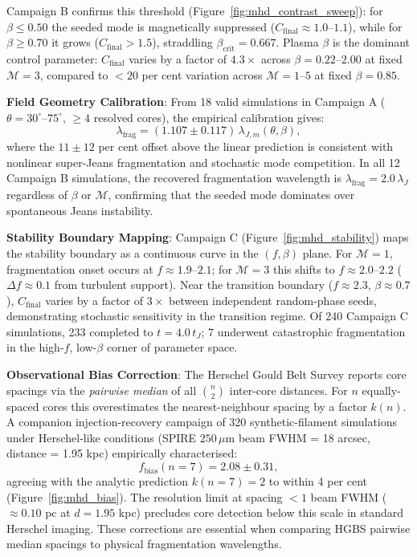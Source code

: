 \documentclass[usenatbib]{rasti}
\begin{document}
Campaign B confirms this threshold (Figure~\ref{fig:mhd_contrast_sweep}): for $\beta \leq 0.50$
the seeded mode is magnetically suppressed ($C_\mathrm{final} \approx 1.0$--$1.1$), while for
$\beta \geq 0.70$ it grows ($C_\mathrm{final} > 1.5$), straddling $\beta_\mathrm{crit} = 0.667$.
Plasma $\beta$ is the dominant control parameter: $C_\mathrm{final}$ varies by a factor of
$4.3\times$ across $\beta = 0.22$--$2.00$ at fixed $\mathcal{M}=3$, compared to $<20$ per cent
variation across $\mathcal{M} = 1$--$5$ at fixed $\beta = 0.85$.

\textbf{Field Geometry Calibration}: From 18 valid simulations in Campaign A ($\theta =
30^\circ$--$75^\circ$, $\geq 4$ resolved cores), the empirical calibration gives:
\begin{equation}
\lambda_\mathrm{frag} = (1.107 \pm 0.117)\,\lambda_{J,m}(\theta,\beta),
\label{eq:calib}
\end{equation}
where the $11 \pm 12$ per cent offset above the linear prediction is consistent with
nonlinear super-Jeans fragmentation and stochastic mode competition. In all 12
Campaign B simulations, the recovered fragmentation wavelength is $\lambda_\mathrm{frag}
= 2.0\,\lambda_J$ regardless of $\beta$ or $\mathcal{M}$, confirming that the seeded
mode dominates over spontaneous Jeans instability.

\textbf{Stability Boundary Mapping}: Campaign C (Figure~\ref{fig:mhd_stability}) maps the
stability boundary as a continuous curve in the $(f, \beta)$ plane. For $\mathcal{M} = 1$,
fragmentation onset occurs at $f \approx 1.9$--$2.1$; for $\mathcal{M} = 3$ this shifts to
$f \approx 2.0$--$2.2$ ($\Delta f \approx 0.1$ from turbulent support). Near the transition
boundary ($f \approx 2.3$, $\beta \approx 0.7$), $C_\mathrm{final}$ varies by a factor of
$3\times$ between independent random-phase seeds, demonstrating stochastic sensitivity in
the transition regime. Of 240 Campaign C simulations, 233 completed to $t = 4.0\,t_J$; 7
underwent catastrophic fragmentation in the high-$f$, low-$\beta$ corner of parameter space.

\textbf{Observational Bias Correction}: The Herschel Gould Belt Survey reports core spacings
via the \emph{pairwise median} of all $\binom{n}{2}$ inter-core distances. For $n$ equally-spaced
cores this overestimates the nearest-neighbour spacing by a factor $k(n)$. A companion
injection-recovery campaign of 320 synthetic-filament simulations under Herschel-like conditions
(SPIRE $250\,\mu$m beam FWHM = 18 arcsec, distance = 1.95 kpc) empirically characterised:
\begin{equation}
f_\mathrm{bias}(n=7) = 2.08 \pm 0.31,
\label{eq:bias}
\end{equation}
agreeing with the analytic prediction $k(n=7) = 2$ to within 4 per cent (Figure~\ref{fig:mhd_bias}). The resolution
limit at spacing $< 1$ beam FWHM ($\approx 0.10$ pc at $d = 1.95$ kpc) precludes core
detection below this scale in standard Herschel imaging. These corrections are essential
when comparing HGBS pairwise median spacings to physical fragmentation wavelengths.
\end{document}
